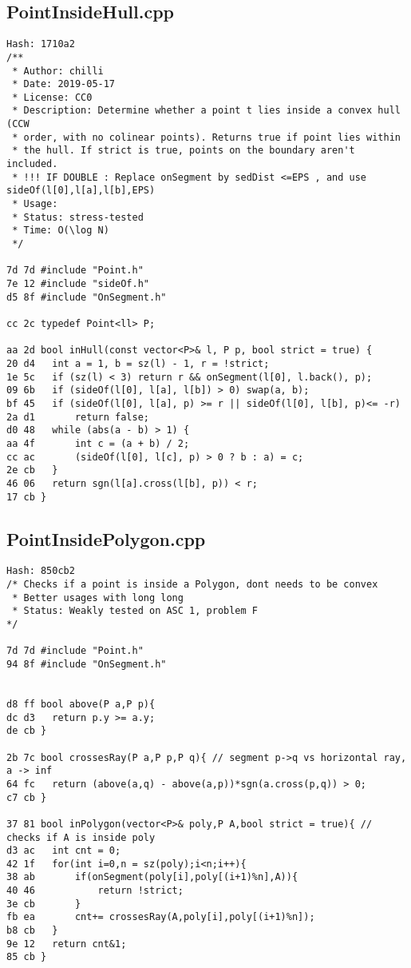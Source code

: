 \documentclass[11pt, a4paper, twoside]{article}
\begin{document}
\subsection{PointInsideHull.cpp}
\begin{lstlisting}
Hash: 1710a2
/**
 * Author: chilli
 * Date: 2019-05-17
 * License: CC0
 * Description: Determine whether a point t lies inside a convex hull (CCW
 * order, with no colinear points). Returns true if point lies within
 * the hull. If strict is true, points on the boundary aren't included.
 * !!! IF DOUBLE : Replace onSegment by sedDist <=EPS , and use sideOf(l[0],l[a],l[b],EPS) 
 * Usage:
 * Status: stress-tested
 * Time: O(\log N)
 */

7d 7d #include "Point.h"
7e 12 #include "sideOf.h"
d5 8f #include "OnSegment.h"

cc 2c typedef Point<ll> P;

aa 2d bool inHull(const vector<P>& l, P p, bool strict = true) {
20 d4 	int a = 1, b = sz(l) - 1, r = !strict;
1e 5c 	if (sz(l) < 3) return r && onSegment(l[0], l.back(), p);
09 6b 	if (sideOf(l[0], l[a], l[b]) > 0) swap(a, b);
bf 45 	if (sideOf(l[0], l[a], p) >= r || sideOf(l[0], l[b], p)<= -r)
2a d1 		return false;
d0 48 	while (abs(a - b) > 1) {
aa 4f 		int c = (a + b) / 2;
cc ac 		(sideOf(l[0], l[c], p) > 0 ? b : a) = c;
2e cb 	}
46 06 	return sgn(l[a].cross(l[b], p)) < r;
17 cb }
\end{lstlisting}

\subsection{PointInsidePolygon.cpp}
\begin{lstlisting}
Hash: 850cb2
/* Checks if a point is inside a Polygon, dont needs to be convex
 * Better usages with long long
 * Status: Weakly tested on ASC 1, problem F
*/

7d 7d #include "Point.h"
94 8f #include "OnSegment.h"


d8 ff bool above(P a,P p){
dc d3 	return p.y >= a.y;
de cb }

2b 7c bool crossesRay(P a,P p,P q){ // segment p->q vs horizontal ray, a -> inf
64 fc 	return (above(a,q) - above(a,p))*sgn(a.cross(p,q)) > 0;
c7 cb }

37 81 bool inPolygon(vector<P>& poly,P A,bool strict = true){ // checks if A is inside poly
d3 ac 	int cnt = 0;
42 1f 	for(int i=0,n = sz(poly);i<n;i++){
38 ab 		if(onSegment(poly[i],poly[(i+1)%n],A)){
40 46 			return !strict;
3e cb 		}
fb ea 		cnt+= crossesRay(A,poly[i],poly[(i+1)%n]);
b8 cb 	}
9e 12 	return cnt&1;
85 cb }
\end{lstlisting}
\end{document}
